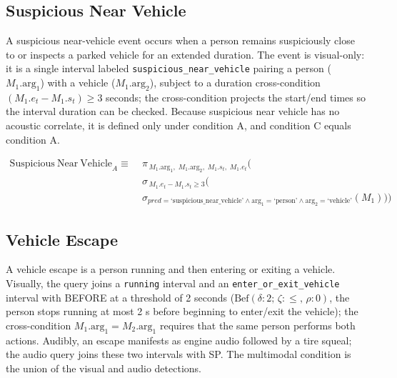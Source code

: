 \subsection{Suspicious Near Vehicle}

A suspicious near-vehicle event occurs when a person remains suspiciously close to or inspects a parked vehicle for an extended duration. The event is visual-only: it is a single interval labeled \texttt{suspicious\_near\_vehicle} pairing a person ($M_1.\mathrm{arg}_1$) with a vehicle ($M_1.\mathrm{arg}_2$), subject to a duration cross-condition $(M_1.e_t - M_1.s_t) \ge 3$ seconds; the cross-condition projects the start/end times so the interval duration can be checked. Because suspicious near vehicle has no acoustic correlate, it is defined only under condition A, and condition C equals condition A.

\begin{flushleft}
$\begin{aligned}
\mathrm{Suspicious\ Near\ Vehicle}_A \equiv &\; \pi_{\,M_1.\mathrm{arg}_1,\; M_1.\mathrm{arg}_2,\; M_1.s_t,\; M_1.e_t} ( \\
&\; \sigma_{\,M_1.e_t - M_1.s_t \ge 3} ( \\
&\; \sigma_{\textit{pred}=\text{`suspicious\_near\_vehicle'} \land \mathrm{arg}_1=\text{`person'} \land \mathrm{arg}_2=\text{`vehicle'}}(M_1) ) )
\end{aligned}$\\
\end{flushleft}

\subsection{Vehicle Escape}

A vehicle escape is a person running and then entering or exiting a vehicle. Visually, the query joins a \texttt{running} interval and an \texttt{enter\_or\_exit\_vehicle} interval with BEFORE at a threshold of 2 seconds ($\mathrm{Bef}(\delta:2;\,\zeta:\le,\,\rho:0)$, the person stops running at most 2 s before beginning to enter/exit the vehicle); the cross-condition $M_1.\mathrm{arg}_1 = M_2.\mathrm{arg}_1$ requires that the same person performs both actions. Audibly, an escape manifests as engine audio followed by a tire squeal; the audio query joins these two intervals with SP. The multimodal condition is the union of the visual and audio detections.


